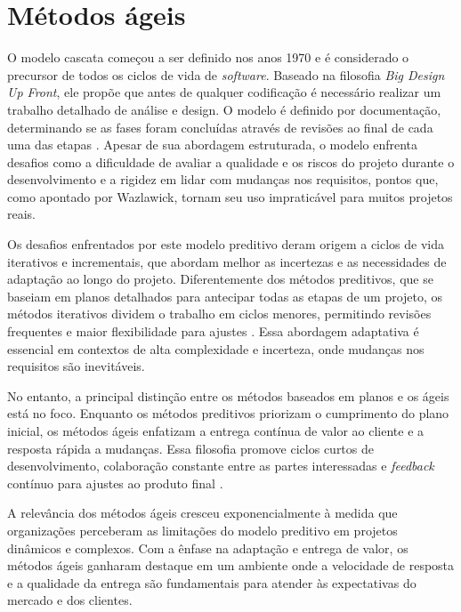 \documentclass[
	12pt,
	openright,
	twoside,
	a4paper,
	english,
	brazil
	]{abntex2}
\begin{document}

\section{Métodos ágeis}

O modelo cascata começou a ser definido nos anos 1970 e é considerado o precursor de todos os ciclos de vida de \textit{software}. Baseado na filosofia \textit{Big Design Up Front}, ele propõe que antes de qualquer codificação é necessário realizar um trabalho detalhado de análise e design. O modelo é definido por documentação, determinando se as fases foram concluídas através de revisões ao final de cada uma das etapas \cite{wazlawick2019}. Apesar de sua abordagem estruturada, o modelo enfrenta desafios como a dificuldade de avaliar a qualidade e os riscos do projeto durante o desenvolvimento e a rigidez em lidar com mudanças nos requisitos, pontos que, como apontado por Wazlawick, tornam seu uso impraticável para muitos projetos reais.

Os desafios enfrentados por este modelo preditivo deram origem a ciclos de vida iterativos e incrementais, que abordam melhor as incertezas e as necessidades de adaptação ao longo do projeto. Diferentemente dos métodos preditivos, que se baseiam em planos detalhados para antecipar todas as etapas de um projeto, os métodos iterativos dividem o trabalho em ciclos menores, permitindo revisões frequentes e maior flexibilidade para ajustes \cite{AgileGuide}. Essa abordagem adaptativa é essencial em contextos de alta complexidade e incerteza, onde mudanças nos requisitos são inevitáveis.

No entanto, a principal distinção entre os métodos baseados em planos e os ágeis está no foco. Enquanto os métodos preditivos priorizam o cumprimento do plano inicial, os métodos ágeis enfatizam a entrega contínua de valor ao cliente e a resposta rápida a mudanças. Essa filosofia promove ciclos curtos de desenvolvimento, colaboração constante entre as partes interessadas e \textit{feedback} contínuo para ajustes ao produto final \cite{AgileGuide}.

A relevância dos métodos ágeis cresceu exponencialmente à medida que organizações perceberam as limitações do modelo preditivo em projetos dinâmicos e complexos. Com a ênfase na adaptação e entrega de valor, os métodos ágeis ganharam destaque em um ambiente onde a velocidade de resposta e a qualidade da entrega são fundamentais para atender às expectativas do mercado e dos clientes.
\end{document}
